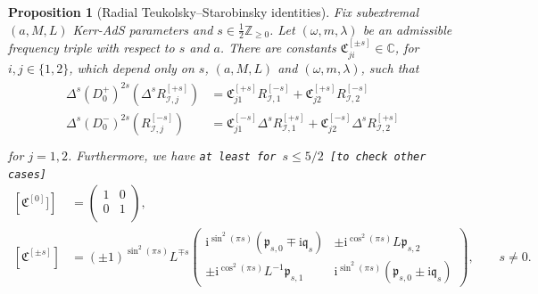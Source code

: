 \documentclass[11pt]{article}
\newtheorem{proposition}{Proposition}[section]
\newcommand{\ii}{\mathrm{i}}
\newcommand{\cI}{\mathcal I}
\numberwithin{equation}{section}
\begin{document}
\begin{proposition}[Radial Teukolsky--Starobinsky identities]\label{prop:radial-ts-KAdS}
Fix subextremal $(a,M,L)$ Kerr-AdS parameters and $s\in \frac12\mathbb Z_{\geq0}$. Let $(\omega,m,\lambda)$ be an admissible frequency triple with respect to $s$ and $a$. There are constants $\mathfrak C^{[\pm s]}_{ji}\in\mathbb C$, for $i,j\in\{1,2\}$, which depend only on $s$, $(a,M,L)$ and $(\omega,m,\lambda)$, such that 
\begin{align}
\begin{split}
\Delta^s(D^+ _0)^{2s}\left(\Delta^s R^{[+ s]}_{\cI,j}\right)
&=\mathfrak C^{[+ s]}_{j1}R^{[- s]}_{\cI,1}
  +\mathfrak C^{[+ s]}_{j2}R^{[- s]}_{\cI,2}\\
\Delta^s(D^- _0)^{2s}\left( R^{[-s]}_{\cI,j}\right)
&=\mathfrak C^{[- s]}_{j1}\Delta^sR^{[+ s]}_{\cI,1}
  +\mathfrak C^{[- s]}_{j2}\Delta^sR^{[+ s]}_{\cI,2}
\\
  \end{split}
\label{eq:TS-identities-KAdS}
\end{align}
for $j=1,2$. Furthermore, we have \texttt{at least for $s\leq 5/2$ [to check other cases]}
\begin{align*}
\left[\mathfrak C^{[0]}]\right]&=\begin{pmatrix}
1&0\\
0&1\\
\end{pmatrix},\\
\left[\mathfrak C^{[\pm s]}\right]&=(\pm 1)^{\sin^2(\pi s)}L^{\mp s}
\begin{pmatrix}
  \ii^{\sin^2(\pi s)}(\mathfrak p_{s,0}\mp \ii \mathfrak q_s) & \pm \ii^{\cos^2(\pi s)} L \mathfrak p_{s,2}\\
\pm  \ii^{\cos^2(\pi s)}L^{-1}\mathfrak p_{s,1}& \ii^{\sin^2(\pi s)}(\mathfrak p_{s,0}\pm \ii \mathfrak q_s) 
\end{pmatrix}, \qquad s\neq 0.
\end{align*}

\end{proposition}
\end{document}
